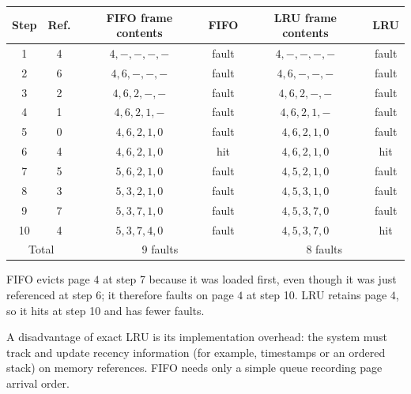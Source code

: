 \begin{center}
\begin{tabular}{c|c|c|c|c|c}
Step & Ref. & FIFO frame contents & FIFO & LRU frame contents & LRU\\ \hline
1  & 4 & \(4,-,-,-,-\) & fault & \(4,-,-,-,-\) & fault\\
2  & 6 & \(4,6,-,-,-\) & fault & \(4,6,-,-,-\) & fault\\
3  & 2 & \(4,6,2,-,-\) & fault & \(4,6,2,-,-\) & fault\\
4  & 1 & \(4,6,2,1,-\) & fault & \(4,6,2,1,-\) & fault\\
5  & 0 & \(4,6,2,1,0\) & fault & \(4,6,2,1,0\) & fault\\
6  & 4 & \(4,6,2,1,0\) & hit   & \(4,6,2,1,0\) & hit\\
7  & 5 & \(5,6,2,1,0\) & fault & \(4,5,2,1,0\) & fault\\
8  & 3 & \(5,3,2,1,0\) & fault & \(4,5,3,1,0\) & fault\\
9  & 7 & \(5,3,7,1,0\) & fault & \(4,5,3,7,0\) & fault\\
10 & 4 & \(5,3,7,4,0\) & fault & \(4,5,3,7,0\) & hit\\ \hline
\multicolumn{2}{c|}{Total} & \multicolumn{2}{c|}{9 faults}
& \multicolumn{2}{c}{8 faults}
\end{tabular}
\end{center}

FIFO evicts page \(4\) at step 7 because it was loaded first, even though it
was just referenced at step 6; it therefore faults on page \(4\) at step 10.
LRU retains page \(4\), so it hits at step 10 and has fewer faults.

A disadvantage of exact LRU is its implementation overhead: the system must
track and update recency information (for example, timestamps or an ordered
stack) on memory references. FIFO needs only a simple queue recording page
arrival order.
